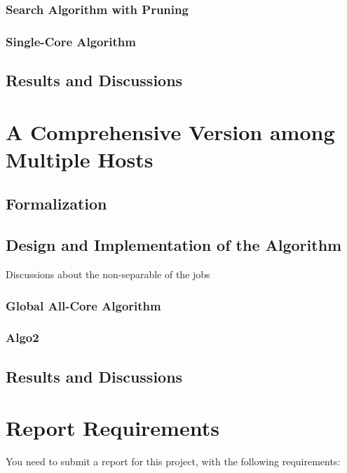 \documentclass{llncs}
\begin{document}
\subsubsection{Search Algorithm with Pruning}

\subsubsection{Single-Core Algorithm}

\subsection{Results and Discussions}\label{subsec-result1}

\section{A Comprehensive Version among Multiple Hosts}
\label{sec-problem2}

\subsection{Formalization}\label{subsec-form2}

\subsection{Design and Implementation of the Algorithm}\label{subsec-algo2}
Discussions about the non-separable of the jobs
\subsubsection{Global All-Core Algorithm}

\subsubsection{Algo2}

\subsection{Results and Discussions}\label{subsec-result2}

\section{Report Requirements}

You need to submit a report for this project, with the following requirements:
\end{document}
